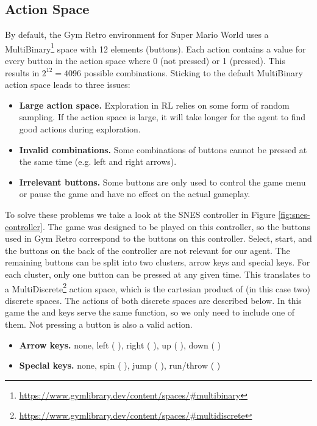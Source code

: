 \documentclass[a4paper]{article}
\newcommand*{\img}[1]{%
    \raisebox{-.25\baselineskip}{%
        \texttt{[image: \#1]}%
    }%
}
\begin{document}
\subsection{Action Space}
By default, the Gym Retro environment for Super Mario World uses a MultiBinary\footnote{\url{https://www.gymlibrary.dev/content/spaces/\#multibinary}} space with 12 elements (buttons).
Each action contains a value for every button in the action space where 0 (not pressed) or 1 (pressed). This results in $2^{12}=4096$ possible combinations.
Sticking to the default MultiBinary action space leads to three issues:
\begin{itemize}
    \item \textbf{Large action space.}
        Exploration in RL relies on some form of random sampling.
        If the action space is large, it will take longer for the agent to find good actions during exploration.
    \item \textbf{Invalid combinations.}
        Some combinations of buttons cannot be pressed at the same time (e.g. left and right arrows).
    \item \textbf{Irrelevant buttons.} Some buttons are only used to control the game menu or pause the game and have no effect on the actual gameplay.
\end{itemize}
To solve these problems we take a look at the SNES controller in Figure \ref{fig:snes-controller}.
The game was designed to be played on this controller, so the buttons used in Gym Retro correspond to the buttons on this controller.
Select, start, and the buttons on the back of the controller are not relevant for our agent.
The remaining buttons can be split into two clusters, arrow keys and special keys.
For each cluster, only one button can be pressed at any given time.
This translates to a MultiDiscrete\footnote{\url{https://www.gymlibrary.dev/content/spaces/\#multidiscrete}} action space, which is the cartesian product of (in this case two) discrete spaces.
The actions of both discrete spaces are described below.
In this game the \img{SuperNintendo-Button-X} and \img{SuperNintendo-Button-Y} keys serve the same function, so we only need to include one of them.
Not pressing a button is also a valid action.
\begin{itemize}
    \item \textbf{Arrow keys.} none, left (\img{SuperNintendo-Dpad-Left}), right (\img{SuperNintendo-Dpad-Right}), up (\img{SuperNintendo-Dpad-Up}), down (\img{SuperNintendo-Dpad-Down})
    \item \textbf{Special keys.} none, spin (\img{SuperNintendo-Button-A}), jump (\img{SuperNintendo-Button-B}), run/throw (\img{SuperNintendo-Button-X})
\end{itemize}
\end{document}
